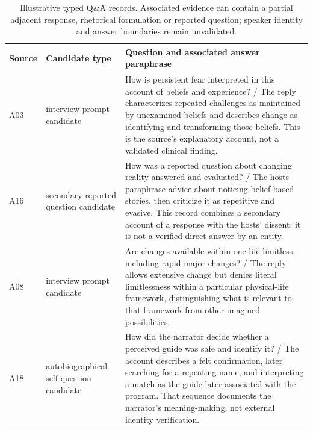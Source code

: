 \begin{table}[t]
\centering\small
\begin{tabular}{lp{}p{}}
\toprule
Source & Candidate type & Question and associated answer paraphrase\\
\midrule
A03 & interview prompt candidate & How is persistent fear interpreted in this account of beliefs and experience? / The reply characterizes repeated challenges as maintained by unexamined beliefs and describes change as identifying and transforming those beliefs. This is the source's explanatory account, not a validated clinical finding.\\
A16 & secondary reported question candidate & How was a reported question about changing reality answered and evaluated? / The hosts paraphrase advice about noticing belief-based stories, then criticize it as repetitive and evasive. This record combines a secondary account of a response with the hosts' dissent; it is not a verified direct answer by an entity.\\
A08 & interview prompt candidate & Are changes available within one life limitless, including rapid major changes? / The reply allows extensive change but denies literal limitlessness within a particular physical-life framework, distinguishing what is relevant to that framework from other imagined possibilities.\\
A18 & autobiographical self question candidate & How did the narrator decide whether a perceived guide was safe and identify it? / The account describes a felt confirmation, later searching for a repeating name, and interpreting a match as the guide later associated with the program. That sequence documents the narrator's meaning-making, not external identity verification.\\
\bottomrule
\end{tabular}
\caption{Illustrative typed Q\&A records. Associated evidence can contain a partial adjacent response, rhetorical formulation or reported question; speaker identity and answer boundaries remain unvalidated.}
\end{table}
